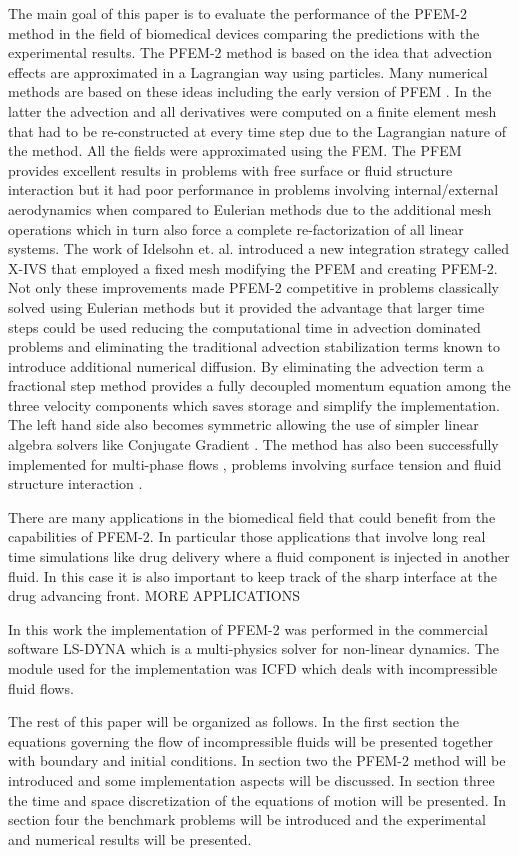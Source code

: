The main goal of this paper is to evaluate the performance of the PFEM-2 method in the field of biomedical devices comparing the predictions with the experimental results. The PFEM-2 method is based on the idea that advection effects are approximated in a Lagrangian way using particles. Many numerical methods are based on these ideas \cite{sph,pic,mac,mps,mpm} including the early version of PFEM \cite{sergio:pfem}. In the latter the advection and all derivatives were computed on a finite element mesh that had to be re-constructed at every time step due to the Lagrangian nature of the method. All the fields were approximated using the FEM. The PFEM provides excellent results in problems with free surface or fluid structure interaction but it had poor performance in problems involving internal/external aerodynamics when compared to Eulerian methods due to the additional mesh operations which in turn also force a complete re-factorization of all linear systems. The work of Idelsohn et. al. \cite{sergio:xivs1,sergio:xivs2} introduced a new integration strategy called X-IVS that employed a fixed mesh modifying the PFEM and creating PFEM-2. Not only these improvements made PFEM-2 competitive in problems classically solved using Eulerian methods but it provided the advantage that larger time steps could be used \cite{gimenez:parallel} reducing the computational time in advection dominated problems and eliminating the traditional advection stabilization terms known to introduce additional numerical diffusion. By eliminating the advection term a fractional step method provides a fully decoupled momentum equation among the three velocity components which saves storage and simplify the implementation. The left hand side also becomes symmetric allowing the use of simpler linear algebra solvers like Conjugate Gradient \cite{conjgrad}. The method has also been successfully implemented for multi-phase flows \cite{sergio:pfem2_lts,gimenez:fs,gimenez:tesis}, problems involving surface tension \cite{gimenez:st} and fluid structure interaction \cite{pablo:FSI}.

There are many applications in the biomedical field that could benefit from the capabilities of PFEM-2. In particular those applications that involve long real time simulations like drug delivery where a fluid component is injected in another fluid. In this case it is also important to keep track of the sharp interface at the drug advancing front. {MORE APPLICATIONS}

In this work the implementation of PFEM-2 was performed in the commercial software LS-DYNA\textsuperscript{\textregistered} which is a multi-physics solver for non-linear dynamics. The module used for the implementation was ICFD which deals with incompressible fluid flows. 

The rest of this paper will be organized as follows. 
In the first section the equations governing the flow of incompressible fluids will be presented together with boundary and initial conditions. 
In section two the PFEM-2 method will be introduced and some implementation aspects will be discussed.
In section three the time and space discretization of the equations of motion will be presented. 
In section four the benchmark problems will be introduced and the experimental and numerical results will be presented.
